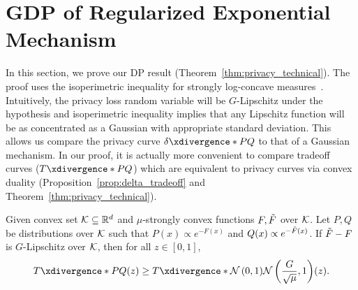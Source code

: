 \section{GDP of Regularized Exponential Mechanism}
In this section, we prove our DP result (Theorem~\ref{thm:privacy_technical}). 
The proof uses the isoperimetric inequality for strongly log-concave measures~\cite{Led99}. Intuitively, the privacy loss random variable will be $G$-Lipschitz under the hypothesis and isoperimetric inequality implies that any Lipschitz function will be as concentrated as a Gaussian with appropriate standard deviation. This allows us compare the privacy curve $\deltacurve{P}{Q}$ to that of a Gaussian mechanism. In our proof, it is actually more convenient to compare tradeoff curves ($\tradeoff{P}{Q}$) which are equivalent to privacy curves via convex duality (Proposition~\ref{prop:delta_tradeoff} and Theorem~\ref{thm:privacy_technical}).


\begin{theorem}
\label{thm:privacy_technical_tradeoff}
Given convex set $\mathcal K\subseteq \mathbb{R}^d$ and $\mu$-strongly convex functions $F,\Tilde{F}$ over $\mathcal K$. Let $P,Q$ be distributions over $\mathcal K$ such that $P(x)\propto e^{-F(x)}$ and $Q(x)\propto e^{-\Tilde{F}(x)}$.
If $\Tilde{F}-F$ is $G$-Lipschitz over $\mathcal K$, then for all $z\in[0,1]$,
\begin{align*}
    \tradeoff{P}{Q}(z) 
    \ge \tradeoff{\cN\lp 0,1\rp}{\cN\lp\frac{G}{\sqrt{\mu}},1\rp}(z).
\end{align*}
\end{theorem}

